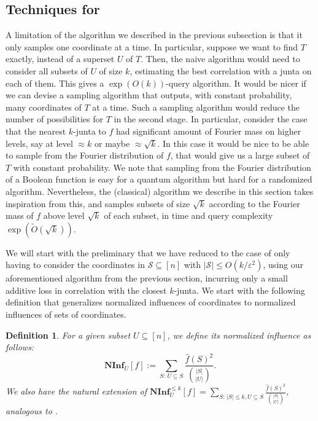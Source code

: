 \documentclass[10pt,a4paper]{article}
\theoremstyle{plain}
\newtheorem{definition}[theorem]{Definition}
\theoremstyle{remark}
\theoremstyle{plain}
\newcommand\NormInf{{\mathbf{NInf}}}
\newcommand{\eps}{\varepsilon}
\renewcommand{\hat}{\widehat}
\renewcommand{\tilde}{\widetilde}
\newcommand{\calS}{\mathcal{S}}
\newcommand{\InfluentialCoords}{\calS}
\begin{document}
\subsection{Techniques for }
\label{subsection:main-results-techniques}



A limitation of the algorithm we described in the previous subsection is that it only samples one coordinate at a time. 
In particular, suppose we want to find $T$ exactly, instead of a superset $U$ of $T$. Then, the naive algorithm would need to consider all subsets of $U$ of size $k$, estimating the best correlation with a junta on each of them. This gives a $\exp(O(k))$-query algorithm.
It would be nicer if we can devise a sampling algorithm that outputs, with constant probability, many coordinates of $T$ at a time. Such a sampling algorithm would reduce the number of possibilities for $T$ in the second stage.
In particular, consider the case that the nearest $k$-junta to $f$ had significant amount of Fourier mass on higher levels, say at level $\approx k$ or maybe $\approx \sqrt{k}$. In this case it would be nice to be able to sample from the Fourier distribution of $f$, that would give us a large subset of $T$ with constant probability. We note that sampling from the Fourier distribution of a Boolean function is easy for a quantum algorithm but hard for a randomized algorithm. Nevertheless, the (classical) algorithm we describe in this section takes inspiration from this, and samples subsets of size $\sqrt{k}$ according to the Fourier mass of $f$ above level $\sqrt{k}$ of each subset, in time and query complexity $\exp(\tilde{O}(\sqrt{k}))$. 

We will start with the preliminary that we have reduced to the case of only having to consider the coordinates in $\InfluentialCoords \subseteq [n]$ with $|\InfluentialCoords| \leq O(k/\eps^2)$, using our aforementioned algorithm from the previous section, incurring only a small additive loss in correlation with the closest $k$-junta. We start with the following definition that generalizes normalized influences of coordinates to normalized influences of sets of coordinates.
\begin{definition}
\label{definition:norm-influences-general}
For a given subset $U \subseteq [n]$, we define its normalized influence as follows:
$$\NormInf_U[f] := \sum_{S:\, U \subseteq S} \frac{\hat{f}(S)^2}{\binom{|S|}{|U|}}.$$
We also have the natural extension of $\NormInf_U^{\leq k}[f] = \sum_{S:\,|S|\le k, U \subseteq S} \frac{\hat{f}(S)^2}{\binom{|S|}{|U|}}$, analogous to .
\end{definition}
\end{document}
